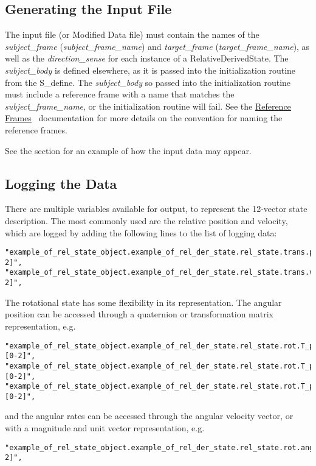 \subsection{Generating the Input File}
The input file (or Modified Data file) must contain the names of the \textit{subject\_frame} (\textit{subject\_frame\_name}) and \textit{target\_frame} (\textit{target\_frame\_name}), as well as the \textit{direction\_sense} for each instance of a RelativeDerivedState.  The \textit{subject\_body} is defined elsewhere, as it is passed into the initialization routine from the S\_define.  The \textit{subject\_body} so passed into the initialization routine must include a reference frame with a name that matches the \textit{subject\_frame\_name}, or the initialization routine will fail.  See the \href{file:\JEODHOME/models/utils/ref\_frames/docs/ref\_frames.pdf}{Reference Frames}~\cite{dynenv:REFFRAMES} documentation for more details on the convention for naming the reference frames.

See the  section for an example of how the input data may appear.

\subsection{Logging the Data}
There are multiple variables available for output, to represent the 12-vector state description.  The most commonly used are the relative position and velocity, which are logged by adding the following lines to the list of logging data:
\begin{verbatim}
"example_of_rel_state_object.example_of_rel_der_state.rel_state.trans.position[0-2]",
"example_of_rel_state_object.example_of_rel_der_state.rel_state.trans.velocity[0-2]",
\end{verbatim}

The rotational state has some flexibility in its representation.  The angular position can be accessed through a quaternion or transformation matrix representation, e.g.
\begin{verbatim}
"example_of_rel_state_object.example_of_rel_der_state.rel_state.rot.T_parent_this[0][0-2]",
"example_of_rel_state_object.example_of_rel_der_state.rel_state.rot.T_parent_this[1][0-2]",
"example_of_rel_state_object.example_of_rel_der_state.rel_state.rot.T_parent_this[2][0-2]",
\end{verbatim}

and the angular rates can be accessed through the angular velocity vector, or with a magnitude and unit vector representation, e.g.
\begin{verbatim}
"example_of_rel_state_object.example_of_rel_der_state.rel_state.rot.ang_vel_this[0-2]",
\end{verbatim}
